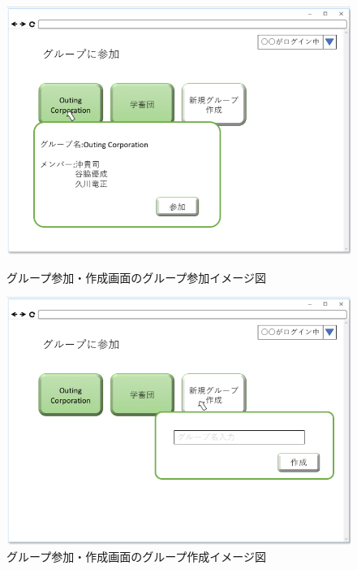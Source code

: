 
\begin{figure}[htbp]
 \begin{minipage}{0.5\hsize}
  \begin{center}
   \includegraphics[width=1\linewidth,clip]{./img/26.png}
  \end{center}
  \caption{グループ参加・作成画面のグループ参加イメージ図}\label{fig:26}
 \end{minipage}
 \begin{minipage}{0.5\hsize}
  \begin{center}
   \includegraphics[width=1\linewidth,clip]{./img/27.png}
  \end{center}
  \caption{グループ参加・作成画面のグループ作成イメージ図}\label{fig:27}
 \end{minipage}
\end{figure}

